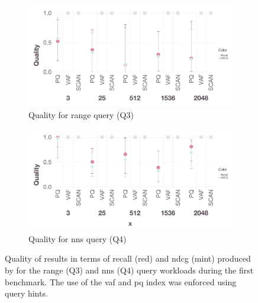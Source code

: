 \begin{figure}[tb]
    \centering
    \begin{subfigure}[b]{\textwidth}
        \centering
        \includegraphics[width=\textwidth]{figures/analytics/analytics-cottontail-quality-range}
        \caption{Quality for range query (Q3)}
        \label{figure:cottontail_analytics_quality_range}
    \end{subfigure}
    \hfill
    \centering
    \begin{subfigure}[b]{\textwidth}
        \centering
        \includegraphics[width=\textwidth]{figures/analytics/analytics-cottontail-quality-nns}
        \caption{Quality for \acrshort{nns} query (Q4)}
        \label{figure:cottontail_analytics_quality_nns}
    \end{subfigure}
    \caption{Quality of results in terms of recall (red) and n\acrshort{dcg} (mint) produced by \cottontail{} for the range (Q3) and \acrshort{nns} (Q4) query workloads during the first benchmark. The use of the \acrshort{vaf} and \acrshort{pq} index was enforced using query hints.}
    \label{figure:cottontail_analytics_quality}
\end{figure}


